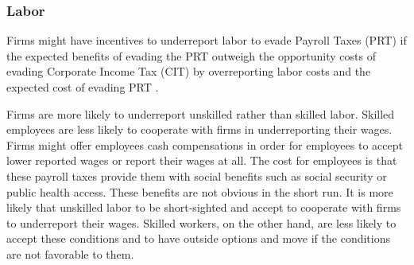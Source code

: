 \documentclass[
  12pt]{article}
\theoremstyle{definition}
\theoremstyle{remark}
\begin{document}
\begin{table}

\caption{\label{tbl-energy}Electric energy market in Colombia
(1981-1991).}


\end{table}%

\subsubsection{Labor}\label{labor}

Firms might have incentives to underreport labor to evade Payroll Taxes
(PRT) if the expected benefits of evading the PRT outweigh the
opportunity costs of evading Corporate Income Tax (CIT) by overreporting
labor costs and the expected cost of evading PRT \citep{Almunia2018}.

Firms are more likely to underreport unskilled rather than skilled
labor. Skilled employees are less likely to cooperate with firms in
underreporting their wages. Firms might offer employees cash
compensations in order for employees to accept lower reported wages or
report their wages at all. The cost for employees is that these payroll
taxes provide them with social benefits such as social security or
public health access. These benefits are not obvious in the short run.
It is more likely that unskilled labor to be short-sighted and accept to
cooperate with firms to underreport their wages. Skilled workers, on the
other hand, are less likely to accept these conditions and to have
outside options and move if the conditions are not favorable to them.
\end{document}
